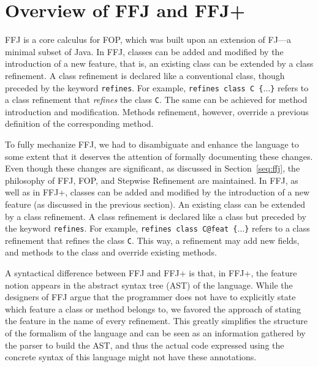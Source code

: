 \chapter{Overview of \gls{FFJ} and \gls{FFJ+}}\label{seq:offj}

\gls{FFJ} is a core calculus for \gls{FOP}, which was built 
upon an extension of \gls{FJ}---a minimal subset of Java. 
In \gls{FFJ}, classes can be added and modified by the 
introduction of a new feature, that is, 
an existing class can be extended by a class refinement. 
A class refinement is declared like a conventional class, though 
preceded by the keyword \texttt{refines}. For example, 
\texttt{refines class C \{$\dots$\}} refers to a class
refinement that
\emph{refines} the class \texttt{C}. The same can be achieved 
for method introduction and modification. Methods refinement,
however, override a previous definition of the corresponding 
method.
 
To fully mechanize \gls{FFJ}, we had to disambiguate and enhance 
the language to some extent that it  deserves the attention of 
formally documenting these changes. 
Even though these changes are significant, as discussed in Section~\ref{seq:ffj}, 
the philosophy of \gls{FFJ}, \gls{FOP}, and Stepwise Refinement are maintained.
In \gls{FFJ}, as well as in \gls{FFJ+}, classes can be added and 
modified by the introduction of a new feature (as discussed in the previous section).
An existing class can be extended by a class refinement. A class refinement is declared like a class but
preceded by the keyword \texttt{refines}. For example, \texttt{refines class C@feat \{$\dots$\}} refers to a class refinement that
refines the class \texttt{C}. This way, a refinement may add new fields, and methods to the class
and override existing methods.  

A syntactical difference between \gls{FFJ} and \gls{FFJ+} is that, in \gls{FFJ+}, 
the feature notion appears in the abstract syntax tree (AST) of the language.
While the designers of \gls{FFJ} argue that the programmer does not have 
to explicitly state which feature a class or method belongs to, 
we favored the approach of stating the feature in the name of every refinement.
This greatly simplifies the structure of the formalism of the language and can be 
seen as an information gathered by the parser to build the AST, and thus 
the actual code expressed using the concrete syntax of this language 
might not have these annotations.

